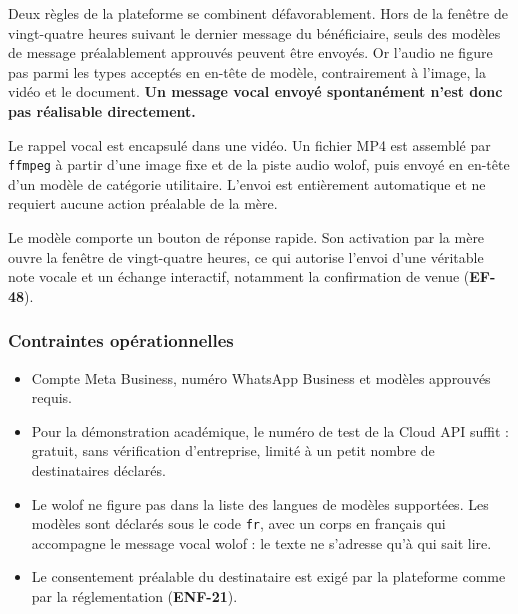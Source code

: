 \documentclass[11pt,a4paper]{article}
\newcommand{\rid}[1]{{\sffamily\bfseries\footnotesize\color{primary}#1}}
\begin{document}
\begin{avertissement}
Deux règles de la plateforme se combinent défavorablement. Hors de la fenêtre de
vingt-quatre heures suivant le dernier message du bénéficiaire, seuls des modèles de
message préalablement approuvés peuvent être envoyés. Or l'audio ne figure pas parmi les
types acceptés en en-tête de modèle, contrairement à l'image, la vidéo et le document.
\textbf{Un message vocal envoyé spontanément n'est donc pas réalisable directement.}
\end{avertissement}

\begin{decisionbox}
Le rappel vocal est encapsulé dans une vidéo. Un fichier MP4 est assemblé par
\texttt{ffmpeg} à partir d'une image fixe et de la piste audio wolof, puis envoyé en
en-tête d'un modèle de catégorie utilitaire. L'envoi est entièrement automatique et ne
requiert aucune action préalable de la mère.
\end{decisionbox}

\begin{decisionbox}
Le modèle comporte un bouton de réponse rapide. Son activation par la mère ouvre la
fenêtre de vingt-quatre heures, ce qui autorise l'envoi d'une véritable note vocale et
un échange interactif, notamment la confirmation de venue (\rid{EF-48}).
\end{decisionbox}

\subsubsection*{Contraintes opérationnelles}

\begin{itemize}
  \item Compte Meta Business, numéro WhatsApp Business et modèles approuvés requis.
  \item Pour la démonstration académique, le numéro de test de la Cloud API suffit :
        gratuit, sans vérification d'entreprise, limité à un petit nombre de destinataires
        déclarés.
  \item Le wolof ne figure pas dans la liste des langues de modèles supportées. Les
        modèles sont déclarés sous le code \texttt{fr}, avec un corps en français qui
        accompagne le message vocal wolof : le texte ne s'adresse qu'à qui sait lire.
  \item Le consentement préalable du destinataire est exigé par la plateforme comme par
        la réglementation (\rid{ENF-21}).
\end{itemize}
\end{document}
